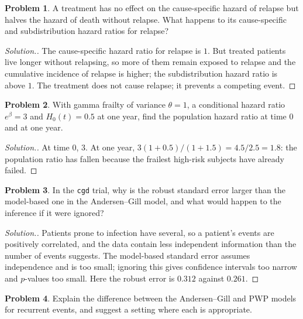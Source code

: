 \documentclass[11pt,a4paper]{article}
\numberwithin{equation}{section}
\theoremstyle{definition}
\newtheorem{problemx}{Problem}[subsection]
\newenvironment{problem}{\begin{problemx}}{\end{problemx}}
\newenvironment{solution}
  {\renewcommand{\qedsymbol}{}\begin{proof}[\textit{Solution}.]}
  {\end{proof}}
\begin{document}
\begin{problem}
A treatment has no effect on the cause-specific hazard of relapse but halves the hazard of death without relapse. What happens to its cause-specific and subdistribution hazard ratios for relapse?
\end{problem}

\begin{solution}
The cause-specific hazard ratio for relapse is $1$. But treated patients live longer without relapsing, so more of them remain exposed to relapse and the cumulative incidence of relapse is higher; the subdistribution hazard ratio is above $1$. The treatment does not cause relapse; it prevents a competing event.
\end{solution}

\begin{problem}
With gamma frailty of variance $\theta = 1$, a conditional hazard ratio $e^\beta = 3$ and $H_0(t) = 0.5$ at one year, find the population hazard ratio at time $0$ and at one year.
\end{problem}

\begin{solution}
At time $0$, $3$. At one year, $3(1 + 0.5)/(1 + 1.5) = 4.5/2.5 = 1.8$: the population ratio has fallen because the frailest high-risk subjects have already failed.
\end{solution}

\begin{problem}
In the \texttt{cgd} trial, why is the robust standard error larger than the model-based one in the Andersen--Gill model, and what would happen to the inference if it were ignored?
\end{problem}

\begin{solution}
Patients prone to infection have several, so a patient's events are positively correlated, and the data contain less independent information than the number of events suggests. The model-based standard error assumes independence and is too small; ignoring this gives confidence intervals too narrow and $p$-values too small. Here the robust error is $0.312$ against $0.261$.
\end{solution}

\begin{problem}
Explain the difference between the Andersen--Gill and PWP models for recurrent events, and suggest a setting where each is appropriate.
\end{problem}
\end{document}

